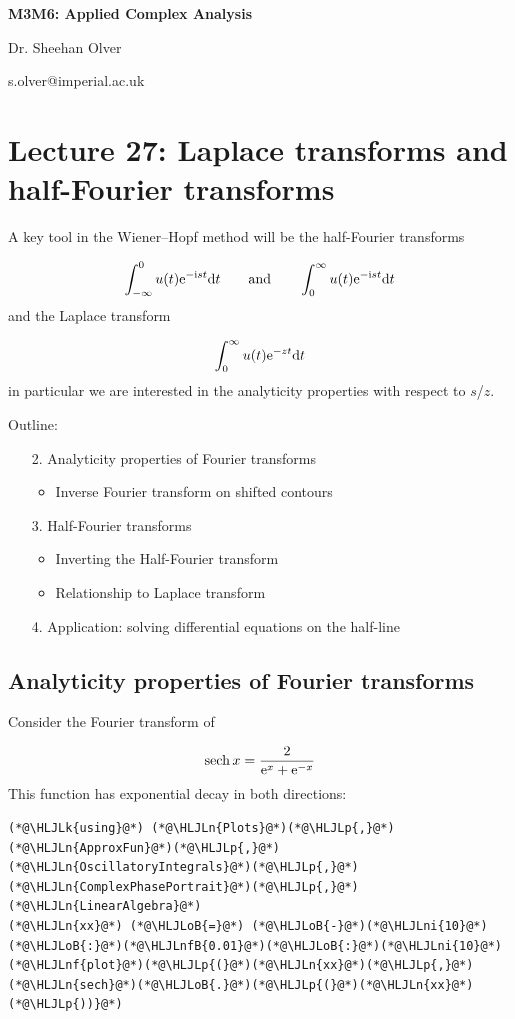 \documentclass[12pt,a4paper]{article}
\newcommand{\HLJLk}[1]{\textcolor[RGB]{148,91,176}{\textbf{#1}}}
\newcommand{\HLJLn}[1]{#1}
\newcommand{\HLJLnf}[1]{\textcolor[RGB]{66,102,213}{#1}}
\newcommand{\HLJLnfB}[1]{\textcolor[RGB]{59,151,46}{#1}}
\newcommand{\HLJLni}[1]{\textcolor[RGB]{59,151,46}{#1}}
\newcommand{\HLJLoB}[1]{\textcolor[RGB]{102,102,102}{\textbf{#1}}}
\newcommand{\HLJLp}[1]{#1}
\def\qqand{\qquad\hbox{and}\qquad}
\def\D{ {\rm d} }
\def\I{ {\rm i} }
\def\E{ {\rm e} }
\def\sech{ {\rm sech}\, }
\def\dt{\D t}
\def\endash{–}
\begin{document}
\textbf{M3M6: Applied Complex Analysis}

Dr. Sheehan Olver

s.olver@imperial.ac.uk

\section{Lecture 27: Laplace transforms and half-Fourier transforms}
A key tool in the Wiener\ensuremath{\endash}Hopf method will be the half-Fourier transforms

\[
\int_{-\infty}^0 u(t) \E^{-\I s t} \dt \qqand \int_0^\infty u(t) \E^{-\I s t} \dt
\]
and the Laplace transform

\[
\int_0^\infty u(t) \E^{-z t} \dt
\]
in particular we are interested in the analyticity properties with respect to $s$/$z$. 

Outline:

\begin{itemize}
\item[2. ] Analyticity properties of Fourier transforms

\begin{itemize}
\item Inverse Fourier transform on shifted contours

\end{itemize}

\item[3. ] Half-Fourier transforms

\begin{itemize}
\item Inverting the Half-Fourier transform


\item Relationship to Laplace transform

\end{itemize}

\item[4. ] Application: solving differential equations on the half-line

\end{itemize}
\subsection{Analyticity properties of Fourier transforms}
Consider the Fourier transform of 

\[
\sech x = {2 \over \E^x + \E^{-x}}
\]
This function has exponential decay in both directions:


\begin{lstlisting}
(*@\HLJLk{using}@*) (*@\HLJLn{Plots}@*)(*@\HLJLp{,}@*) (*@\HLJLn{ApproxFun}@*)(*@\HLJLp{,}@*) (*@\HLJLn{OscillatoryIntegrals}@*)(*@\HLJLp{,}@*) (*@\HLJLn{ComplexPhasePortrait}@*)(*@\HLJLp{,}@*) (*@\HLJLn{LinearAlgebra}@*)
(*@\HLJLn{xx}@*) (*@\HLJLoB{=}@*) (*@\HLJLoB{-}@*)(*@\HLJLni{10}@*)(*@\HLJLoB{:}@*)(*@\HLJLnfB{0.01}@*)(*@\HLJLoB{:}@*)(*@\HLJLni{10}@*)
(*@\HLJLnf{plot}@*)(*@\HLJLp{(}@*)(*@\HLJLn{xx}@*)(*@\HLJLp{,}@*)(*@\HLJLn{sech}@*)(*@\HLJLoB{.}@*)(*@\HLJLp{(}@*)(*@\HLJLn{xx}@*)(*@\HLJLp{))}@*)
\end{lstlisting}
\end{document}
